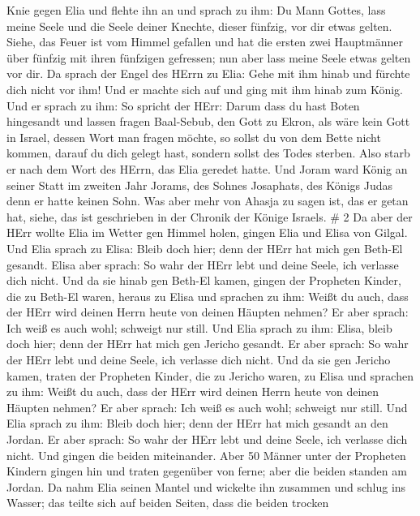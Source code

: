 Knie gegen Elia und flehte ihn an und sprach zu ihm: Du Mann Gottes,
lass meine Seele und die Seele deiner Knechte, dieser fünfzig, vor dir
etwas gelten.  Siehe, das Feuer ist vom Himmel gefallen und
hat die ersten zwei Hauptmänner über fünfzig mit ihren fünfzigen
gefressen; nun aber lass meine Seele etwas gelten vor dir. 
Da sprach der Engel des HErrn zu Elia: Gehe mit ihm hinab und fürchte
dich nicht vor ihm! Und er machte sich auf und ging mit ihm hinab zum
König.  Und er sprach zu ihm: So spricht der HErr: Darum
dass du hast Boten hingesandt und lassen fragen Baal-Sebub, den Gott zu
Ekron, als wäre kein Gott in Israel, dessen Wort man fragen möchte, so
sollst du von dem Bette nicht kommen, darauf du dich gelegt hast,
sondern sollst des Todes sterben.  Also starb er nach dem
Wort des HErrn, das Elia geredet hatte. Und Joram ward König an seiner
Statt im zweiten Jahr Jorams, des Sohnes Josaphats, des Königs Judas
denn er hatte keinen Sohn.  Was aber mehr von Ahasja zu
sagen ist, das er getan hat, siehe, das ist geschrieben in der Chronik
der Könige Israels. \# 2  Da aber der HErr wollte Elia im
Wetter gen Himmel holen, gingen Elia und Elisa von Gilgal. 
Und Elia sprach zu Elisa: Bleib doch hier; denn der HErr hat mich gen
Beth-El gesandt. Elisa aber sprach: So wahr der HErr lebt und deine
Seele, ich verlasse dich nicht. Und da sie hinab gen Beth-El kamen,
 gingen der Propheten Kinder, die zu Beth-El waren, heraus
zu Elisa und sprachen zu ihm: Weißt du auch, dass der HErr wird deinen
Herrn heute von deinen Häupten nehmen? Er aber sprach: Ich weiß es auch
wohl; schweigt nur still.  Und Elia sprach zu ihm: Elisa,
bleib doch hier; denn der HErr hat mich gen Jericho gesandt. Er aber
sprach: So wahr der HErr lebt und deine Seele, ich verlasse dich nicht.
Und da sie gen Jericho kamen,  traten der Propheten Kinder,
die zu Jericho waren, zu Elisa und sprachen zu ihm: Weißt du auch, dass
der HErr wird deinen Herrn heute von deinen Häupten nehmen? Er aber
sprach: Ich weiß es auch wohl; schweigt nur still.  Und Elia
sprach zu ihm: Bleib doch hier; denn der HErr hat mich gesandt an den
Jordan. Er aber sprach: So wahr der HErr lebt und deine Seele, ich
verlasse dich nicht. Und gingen die beiden miteinander. 
Aber 50 Männer unter der Propheten Kindern gingen hin und traten
gegenüber von ferne; aber die beiden standen am Jordan.  Da
nahm Elia seinen Mantel und wickelte ihn zusammen und schlug ins Wasser;
das teilte sich auf beiden Seiten, dass die beiden trocken
